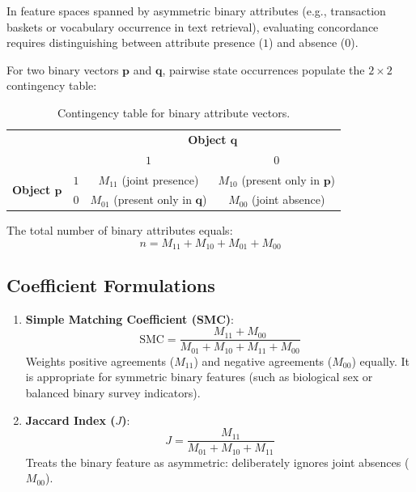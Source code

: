 In feature spaces spanned by asymmetric binary attributes (e.g., transaction baskets or vocabulary occurrence in text retrieval), evaluating concordance requires distinguishing between attribute presence ($1$) and absence ($0$).

For two binary vectors $\mathbf{p}$ and $\mathbf{q}$, pairwise state occurrences populate the $2 \times 2$ contingency table:
\begin{table}[htbp]
\centering
\small
\begin{tabular}{cc|cc}
\toprule
& & \multicolumn{2}{c}{\textbf{Object $\mathbf{q}$}} \\
& & $1$ & $0$ \\
\midrule
\multirow{2}{*}{\textbf{Object $\mathbf{p}$}} & $1$ & $M_{11}$ (joint presence) & $M_{10}$ (present only in $\mathbf{p}$) \\
& $0$ & $M_{01}$ (present only in $\mathbf{q}$) & $M_{00}$ (joint absence) \\
\bottomrule
\end{tabular}
\caption{Contingency table for binary attribute vectors.}
\label{tab:dm-contingency-binary}
\end{table}

The total number of binary attributes equals:
\begin{equation}
    n = M_{11} + M_{10} + M_{01} + M_{00}
\end{equation}

\subsection{Coefficient Formulations}
\begin{enumerate}
    \item \textbf{Simple Matching Coefficient (SMC)}:
    \begin{equation}
        \text{SMC} = \frac{M_{11} + M_{00}}{M_{01} + M_{10} + M_{11} + M_{00}}
    \end{equation}
    Weights positive agreements ($M_{11}$) and negative agreements ($M_{00}$) equally. It is appropriate for symmetric binary features (such as biological sex or balanced binary survey indicators).
    \item \textbf{Jaccard Index ($J$)}:
    \begin{equation}
        J = \frac{M_{11}}{M_{01} + M_{10} + M_{11}}
    \end{equation}
    Treats the binary feature as asymmetric: deliberately ignores joint absences ($M_{00}$).
\end{enumerate}

